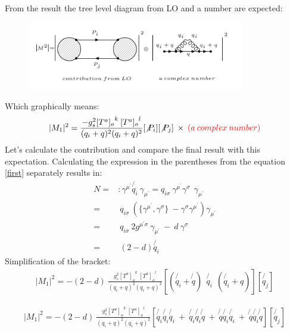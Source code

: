 From the result the tree level diagram from LO and a number are expected:\\
\begin{figure}[h!]
\centering
\includegraphics[width=0.85\textwidth]{images/QQ/expectationqg-qbar.png}
\end{figure}
Which graphically means:\\
\begin{equation}
\begin{split}
|M_1|^2=\frac{-g_s^2  {[T^a]_{o}}^k \: {[T^a]_o}^l }{(q_i + q)^2 (q_i + q)^2}
[\not{P_i}]
[\not{P_j}]\:\times \: {\color[RGB]{255,0,0} (a\: complex\: number)}
\end{split}
\end{equation}  
Let's calculate the contribution and compare the final result with this expectation. Calculating the expression in the parentheses from the equation \ref{first} separately results in:
\begin{equation}
\begin{split}
N=&: \gamma^{{\mu}^{\prime}} \not{q_i} \: \gamma_{{\mu}^{\prime}} = {q_{i\sigma}} \: \gamma^{{\mu}^{\prime}} \gamma^{\sigma} \:\: \gamma_{{\mu}^{\prime}}\\
=& \: {q_{i\sigma}} \: (\lbrace{\gamma^{{\mu}^{\prime}}}, {\gamma^{\sigma}}\rbrace \: - {\gamma^{\sigma}}{\gamma^{{\mu}^{\prime}}})\gamma_{{\mu}^{\prime}}\\
=& \:{q_{i\sigma}} \: 2g^{{{\mu}^{\prime}}{\sigma}} \: \gamma_{{\mu}^{\prime}} \: - \:d\:{\gamma^{\sigma}}\\
=& \:(2-d) \not{q_i}
\end{split}
\end{equation}
Simplification of the bracket:
\begin{equation}
\begin{split}
|M_1|^2=-(2-d)\:\frac{g_s^2  {[T^a]_{o}}^k \: {[T^a]_o}^l }{(q_i + q)^2 (q_i + q)^2}
[(\not{q_i} + \not{q}) \:
 \:\not{q_i} \: 
 \: (\not{q_i} + q)]
[\not{q_j}]
\end{split}
\end{equation}

\begin{equation}
\begin{split}
|M_1|^2=-(2-d)\:\frac{g_s^2  {[T^a]_{o}}^k \: {[T^a]_o}^l }{(q_i + q)^2 (q_i + q)^2}
[\not{q_i} \not{q_i} \not{q_i} \: + \: \not{q_i} \not{q_i} \not{q} \: + \: \not{q} \not{q_i} \not{q_i} \:+\: \not{q} \not{q_i} \not{q}]
[\not{q_j}]
\end{split}
\end{equation}

